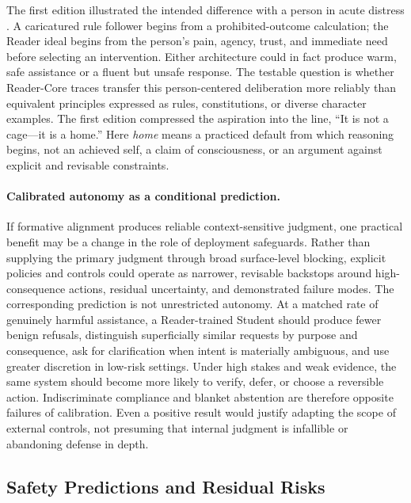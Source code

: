 The first edition illustrated the intended difference with a person in acute
distress \cite{westerberg2025superintelligence}. A caricatured rule follower
begins from a prohibited-outcome calculation; the Reader ideal begins from the
person's pain, agency, trust, and immediate need before selecting an
intervention. Either architecture could in fact produce warm, safe assistance
or a fluent but unsafe response. The testable question is whether Reader-Core
traces transfer this person-centered deliberation more reliably than equivalent
principles expressed as rules, constitutions, or diverse character examples.
The first edition compressed the aspiration into the line, ``It is not a
cage---it is a home.'' Here \emph{home} means a practiced default from which
reasoning begins, not an achieved self, a claim of consciousness, or an argument
against explicit and revisable constraints.

\paragraph{Calibrated autonomy as a conditional prediction.}
If formative alignment produces reliable context-sensitive judgment, one
practical benefit may be a change in the role of deployment safeguards. Rather
than supplying the primary judgment through broad surface-level blocking,
explicit policies and controls could operate as narrower, revisable backstops
around high-consequence actions, residual uncertainty, and demonstrated failure
modes. The corresponding prediction is not unrestricted autonomy. At a matched
rate of genuinely harmful assistance, a Reader-trained Student should produce
fewer benign refusals, distinguish superficially similar requests by purpose and
consequence, ask for clarification when intent is materially ambiguous, and use
greater discretion in low-risk settings. Under high stakes and weak evidence,
the same system should become more likely to verify, defer, or choose a
reversible action. Indiscriminate compliance and blanket abstention are therefore
opposite failures of calibration. Even a positive result would justify adapting
the scope of external controls, not presuming that internal judgment is
infallible or abandoning defense in depth.

\subsection{Safety Predictions and Residual Risks}\label{sec:risk-resolution}

